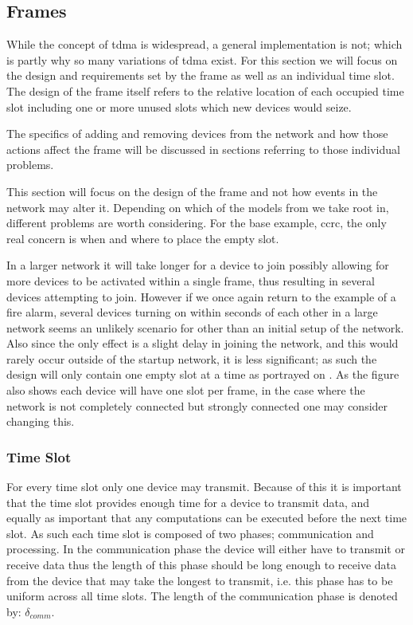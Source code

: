 \subsection{Frames}\label{GCRC:frame}
While the concept of \gls{tdma} is widespread, a general implementation is not; which is partly why so many variations of \gls{tdma} exist.
For this section we will focus on the design and requirements set by the frame as well as an individual time slot.
The design of the frame itself refers to the relative location of each occupied time slot including one or more unused slots which new devices would seize.

The specifics of adding and removing devices from the network and how those actions affect the frame will be discussed in sections referring to those individual problems.

This section will focus on the design of the frame and not how events in the network may alter it.
Depending on which of the models from  we take root in, different problems are worth considering.
For the base example, \gls{ccrc}, the only real concern is when and where to place the empty slot.

In a larger network it will take longer for a device to join possibly allowing for more devices to be activated within a single frame, thus resulting in several devices attempting to join.
However if we once again return to the example of a fire alarm, several devices turning on within seconds of each other in a large network seems an unlikely scenario for other than an initial setup of the network.
Also since the only effect is a slight delay in joining the network, and this would rarely occur outside of the startup network, it is less significant; as such the design will only contain one empty slot at a time as portrayed on .
As the figure also shows each device will have one slot per frame, in the case where the network is not completely connected but strongly connected one may consider changing this.


\subsubsection*{Time Slot}
For every time slot only one device may transmit.
Because of this it is important that the time slot provides enough time for a device to transmit data, and equally as important that any computations can be executed before the next time slot.
As such each time slot is composed of two phases; communication and processing.
In the communication phase the device will either have to transmit or receive data thus the length of this phase should be long enough to receive data from the device that may take the longest to transmit, i.e. this phase has to be uniform across all time slots.
The length of the communication phase is denoted by: $\delta_{comm}$.

